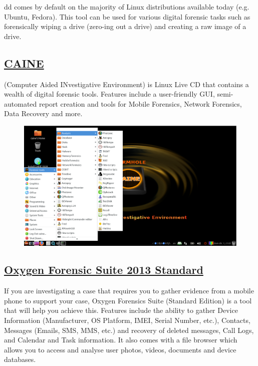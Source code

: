 \documentclass[11pt]{article}
\begin{document}
dd comes by default on the majority of Linux distributions available today (e.g. Ubuntu, Fedora). This tool can be used for various digital forensic tasks such as forensically wiping a drive (zero-ing out a drive) and creating a raw image of a drive.

\subsection{\href{https://www.caine-live.net/page5/page5.html}{CAINE}}

(Computer Aided INvestigative Environment) is Linux Live CD that contains a wealth of digital forensic tools. Features include a user-friendly GUI, semi-automated report creation and tools for Mobile Forensics, Network Forensics, Data Recovery and more.

\begin{figure}[H]
    \centering
    \includegraphics[width=.85\textwidth]{menu11.png}
    \caption{}
\end{figure}
\subsection{\href{https://www.labsystems.co.in/oxygen.html}{Oxygen Forensic Suite 2013 Standard}}

If you are investigating a case that requires you to gather evidence from a mobile phone to support your case, Oxygen Forensics Suite (Standard Edition) is a tool that will help you achieve this. Features include the ability to gather Device Information (Manufacturer, OS Platform, IMEI, Serial Number, etc.), Contacts, Messages (Emails, SMS, MMS, etc.) and recovery of deleted messages, Call Logs, and Calendar and Task information. It also comes with a file browser which allows you to access and analyse user photos, videos, documents and device databases.
\end{document}
